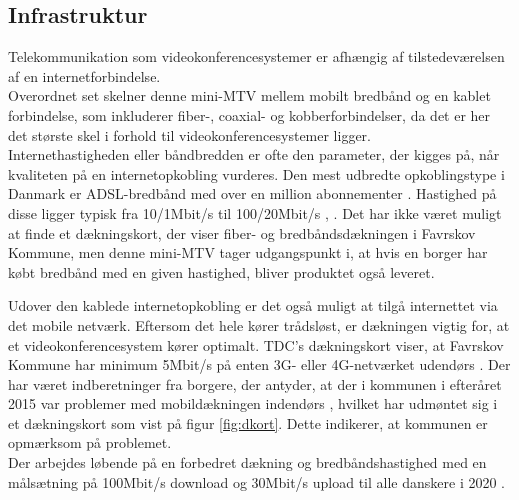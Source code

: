 \subsection{Infrastruktur}
Telekommunikation som  videokonferencesystemer er afhængig af tilstedeværelsen af en  internetforbindelse.\\
Overordnet set skelner denne mini-MTV mellem mobilt bredbånd og en kablet forbindelse, som inkluderer fiber-, coaxial- og kobberforbindelser, da det er her det største skel i forhold til videokonferencesystemer ligger.\\
Internethastigheden eller båndbredden er ofte den parameter, der kigges på, når kvaliteten på en internetopkobling vurderes. Den mest udbredte opkoblingstype i Danmark er ADSL-bredbånd med over en million abonnementer \cite{statadsl}. Hastighed på disse ligger typisk fra 10/1Mbit/s til 100/20Mbit/s \cite{tdchastigheder}, \cite{telenorhastigheder}. Det har ikke været muligt at finde et dækningskort, der viser fiber- og bredbåndsdækningen i Favrskov Kommune, men denne mini-MTV tager udgangspunkt i, at hvis en borger har købt bredbånd med en given hastighed, bliver produktet også leveret.

Udover den kablede internetopkobling er det også muligt at tilgå internettet via det mobile netværk. Eftersom det hele kører trådsløst, er dækningen vigtig for, at et videokonferencesystem kører optimalt. TDC's dækningskort viser, at Favrskov Kommune har minimum 5Mbit/s på enten 3G- eller 4G-netværket udendørs \cite{tdcdaekning}. Der har været indberetninger fra borgere, der antyder, at der i kommunen i efteråret 2015 var problemer med mobildækningen indendørs \cite{tv2oj_daekning}, hvilket har udmøntet sig i et dækningskort som vist på figur \ref{fig:dkort}. Dette indikerer, at kommunen er opmærksom på problemet.\\
Der arbejdes løbende på en forbedret dækning og bredbåndshastighed med en målsætning på 100Mbit/s download og 30Mbit/s upload til alle danskere i 2020 \cite{digitalvel}.




